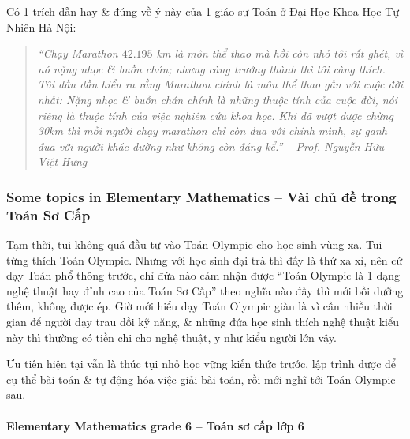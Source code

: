 \documentclass[12pt]{article}
\begin{document}
Có 1 trích dẫn hay \& đúng về ý này của 1 giáo sư Toán ở Đại Học Khoa Học Tự Nhiên Hà Nội:
\begin{quote}\it
	``Chạy Marathon $42.195$ km là môn thể thao mà hồi còn nhỏ tôi rất ghét, vì nó nặng nhọc \& buồn chán; nhưng càng trưởng thành thì tôi càng thích. Tôi dần dần hiểu ra rằng Marathon chính là môn thể thao gần với cuộc đời nhất: Nặng nhọc \& buồn chán chính là những thuộc tính của cuộc đời, nói riêng là thuộc tính của việc nghiên cứu khoa học. Khi đã vượt được chừng 30km thì mỗi người chạy marathon chỉ còn đua với chính mình, sự ganh đua với người khác dường như không còn đáng kể.'' -- Prof. {\sc Nguyễn Hữu Việt Hưng}
\end{quote}


\subsubsection{Some topics in Elementary Mathematics -- Vài chủ đề trong Toán Sơ Cấp}
Tạm thời, tui không quá đầu tư vào Toán Olympic cho học sinh vùng xa. Tui từng thích Toán Olympic. Nhưng với học sinh đại trà thì đấy là thứ xa xỉ, nên cứ dạy Toán phổ thông trước, chỉ đứa nào cảm nhận được ``Toán Olympic là 1 dạng nghệ thuật hay đỉnh cao của Toán Sơ Cấp'' theo nghĩa nào đấy thì mới bồi dưỡng thêm, không được ép. Giờ mới hiểu dạy Toán Olympic giàu là vì cần nhiều thời gian để người dạy trau dồi kỹ năng, \& những đứa học sinh thích nghệ thuật kiểu này thì thường có tiền chi cho nghệ thuật, y như kiểu người lớn vậy.

Ưu tiên hiện tại vẫn là thúc tụi nhỏ học vững kiến thức trước, lập trình được để cụ thể bài toán \& tự động hóa việc giải bài toán, rồi mới nghĩ tới Toán Olympic sau.

\paragraph{Elementary Mathematics grade 6 -- Toán sơ cấp lớp 6}
\end{document}
